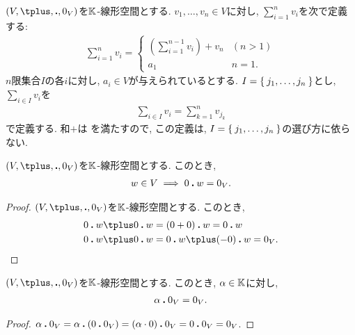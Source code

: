 \begin{remark}
$(V,\plus,\act,0_V)$を$\mathbb{K}$-線形空間とする.
$v_1,\ldots,v_n \in V$に対し,
$\sum_{i=1}^n v_i$を次で定義する:
\begin{align*}
\sum_{i=1}^n v_i
=
\begin{cases}
\left(\sum_{i=1}^{n-1} v_i\right)\plus v_n& (n>1)\\
a_1&n=1.
\end{cases}
\end{align*}
$n$限集合$I$の各$i$に対し, $a_i\in V$が与えられているとする.
$I=\Set{j_1,\ldots,j_n}$とし,
$\sum_{i\in I} v_i$を
\begin{align*}
\sum_{i\in I} v_i
=\sum_{k=1}^n v_{j_k}
\end{align*}
で定義する.
和$\plus$は
を満たすので,
この定義は,
$I=\Set{j_1,\ldots,j_n}$の選び方に依らない.
\end{remark}



\begin{prop}
  \label{prop:zeroveciszeroscalar}
  $(V,\plus ,\act ,0_V)$を$\mathbb{K}$-線形空間とする.
  このとき,
  \begin{align*}
    w\in V \implies 0\mathbin{\boldsymbol{.}} w=0_V. 
  \end{align*}
\end{prop}
\begin{proof}
$(V,\plus,\act,0_V)$を$\mathbb{K}$-線形空間とする.
  このとき,
  \begin{align*}
    0\act w\plus 0\act w&=(0+0)\act w=0\act w\\
    0\act w\plus 0\act w&=0\act w\plus (-0)\act w=0_V.
  \end{align*}
\end{proof}
\begin{prop}
$(V,\plus ,\act ,0_V)$を$\mathbb{K}$-線形空間とする.
このとき, $\alpha \in\mathbb{K}$に対し,
\begin{align*}
\alpha \mathbin{\boldsymbol{.}} 0_V = 0_V.
\end{align*}
\end{prop}
\begin{proof}
$\alpha \mathbin{\boldsymbol{.}} 0_V = \alpha \mathbin{\boldsymbol{.}} (0\mathbin{\boldsymbol{.}} 0_V)= (\alpha \cdot 0)\mathbin{\boldsymbol{.}} 0_V=0\mathbin{\boldsymbol{.}} 0_V=0_V$.
\end{proof}


